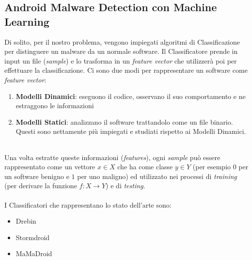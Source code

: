 \subsection{Android Malware Detection con Machine Learning}
Di solito, per il nostro problema, vengono impiegati algoritmi di Classificazione \cite{8672711} per distinguere un malware da un normale software. Il Classificatore prende in input un file (\textit{sample}) e lo trasforma in un \textit{feature vector} che utilizzerà poi per effettuare la classificazione. Ci sono due modi per rappresentare un software come \textit{feature vector}:

\begin{enumerate}
    \item \textbf{Modelli Dinamici}: eseguono il codice, osservano il suo comportamento e ne estraggono le informazioni
    \item \textbf{Modelli Statici}: analizzano il software trattandolo come un file binario. Questi sono nettamente più impiegati e studiati rispetto ai Modelli Dinamici.
\end{enumerate}
\ \\
Una volta estratte queste informazioni (\textit{features}), ogni \textit{sample} può essere rappresentato come un vettore \(x \in X\) che ha come classe \(y \in Y\) (per esempio \(0\) per un software benigno e \(1\) per uno maligno) ed utilizzato nei processi di \textit{training} (per derivare la funzione \(f : X \to Y\)) e di \textit{testing}.\\
\\
I Classificatori che rappresentano lo stato dell'arte sono:

\begin{itemize}
    \item Drebin
    \item Stormdroid
    \item MaMaDroid
\end{itemize}

